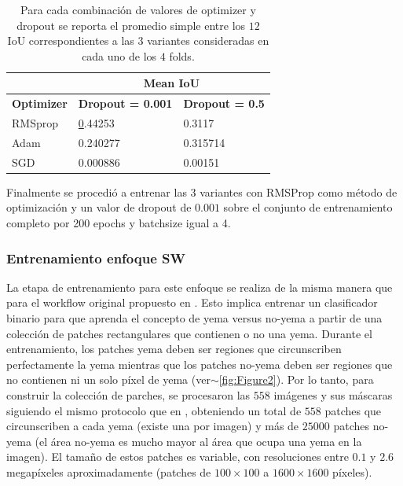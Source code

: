 \documentclass[a4paper,authoryear,review]{elsarticle}
\begin{document}
\begin{table}[]
    \centering
        \begin{tabular}{lll}
            \hline
            \multicolumn{1}{|l|}{} & \multicolumn{2}{c|}{\textbf{Mean IoU}} \\ \hline
            \multicolumn{1}{|c|}{\textbf{Optimizer}} & \multicolumn{1}{c|}{\textbf{Dropout = 0.001}} & \multicolumn{1}{c|}{\textbf{Dropout = 0.5}} \\ \hline
            RMSprop & {\ul 0.44253} & 0.3117 \\
            Adam & 0.240277 & 0.315714 \\
            SGD & 0.000886 & 0.00151 \\ \hline
    \end{tabular}%
    \caption{Para cada combinación de valores de optimizer y dropout se reporta el promedio simple entre los $12$ IoU correspondientes a las $3$ variantes consideradas en cada uno de los $4$ folds.}
    \label{tab:TablaX}
\end{table}


Finalmente se procedió a entrenar las 3 variantes con RMSProp como método de optimización y un valor de dropout de $0.001$ sobre el conjunto de entrenamiento completo por 200 epochs y batchsize igual a 4.

\subsubsection{Entrenamiento enfoque SW} 
\label{sec:swtrain}


La etapa de entrenamiento para este enfoque se realiza de la misma manera que para el workflow original propuesto en \citet{perez2017image}. Esto implica entrenar un clasificador binario para que aprenda el concepto de yema versus no-yema a partir de una colección de patches rectangulares que contienen o no una yema. Durante el entrenamiento, los patches yema deben ser regiones que circunscriben perfectamente la yema mientras que los  patches no-yema deben ser regiones que no contienen ni un solo píxel de yema (ver$\sim$\ref{fig:Figure2}). Por lo tanto, para construir la colección de parches, se procesaron las $558$ imágenes y sus máscaras siguiendo el mismo protocolo que en \citet{perez2017image}, obteniendo un total de $558$ patches que circunscriben a cada yema (existe una por imagen) y más de $25000$ patches no-yema (el área no-yema es mucho mayor al área que ocupa una yema en la imagen). El tamaño de estos patches es variable, con resoluciones entre $0.1$ y $2.6$ megapíxeles aproximadamente (patches de $100 \times 100$ a $1600 \times 1600$ píxeles).
\end{document}
